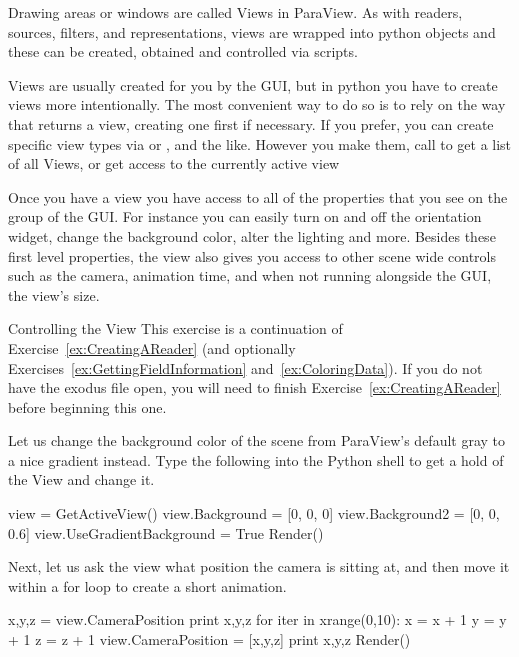 Drawing areas or windows are called Views in ParaView.
As with readers, sources, filters, and representations, views are wrapped
into python objects and these can be created, obtained and controlled via scripts.

Views are usually created for you by the GUI, but in python you have to
create views more intentionally.  The most convenient way to do so is to
rely on the way that  returns a view, creating one first if
necessary.  If you prefer, you can create specific view types via
 or ,
 and the like.  However you make them, call
 to get a list of all Views, or
 get access to the currently active view

Once you have a view you have access to all of the properties that you see on
the  group of the GUI. For instance you can easily turn on and off the orientation widget, change the background color, alter the lighting and more.
Besides these first level properties, the view also gives you access to other scene wide controls such as the camera, animation time, and when not running alongside the GUI, the view's size.

\begin{exercise}{Controlling the View}
  \label{ex:ControlView}%
  This exercise is a continuation of Exercise~\ref{ex:CreatingAReader} (and
  optionally Exercises~\ref{ex:GettingFieldInformation}
  and~\ref{ex:ColoringData}). If you do not have the exodus file open, you
  will need to finish Exercise~\ref{ex:CreatingAReader} before beginning
  this one.

  Let us change the background color of the scene from ParaView's default gray 
  to a nice gradient instead. Type the following into the Python shell
  to get a hold of the View and change it.

  \begin{python}
view = GetActiveView()
view.Background = [0, 0, 0]
view.Background2 = [0, 0, 0.6]
view.UseGradientBackground = True
Render()
  \end{python}

  Next, let us ask the view what position the camera is sitting at, and
  then move it within a for loop to create a short animation.
  \begin{python}
x,y,z = view.CameraPosition
print x,y,z
for iter in xrange(0,10):
  x = x + 1
  y = y + 1
  z = z + 1
  view.CameraPosition = [x,y,z]
  print x,y,z
  Render()
  \end{python}

\end{exercise}


